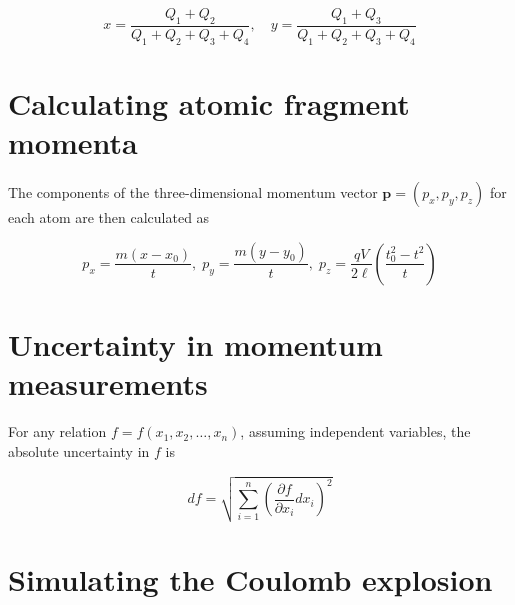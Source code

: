 \begin{equation}
x = \frac{Q_1 + Q_2}{Q_1 + Q_2 + Q_3 + Q_4} ,\quad
y = \frac{Q_1 + Q_3}{Q_1 + Q_2 + Q_3 + Q_4}
\end{equation}


\section{Calculating atomic fragment momenta}
The components of the three-dimensional momentum vector $\mathbf{p} = (p_x,p_y,p_z)$ for each atom are then calculated as

\begin{equation}
p_x = \frac{m(x-x_0)}{t} ,\;
p_y = \frac{m(y-y_0)}{t} ,\;
p_z = \frac{qV}{2\ell} \left( \frac{t_0^2 - t^2}{t} \right)
\end{equation}

\section{Uncertainty in momentum measurements}
For any relation $f = f(x_1, x_2, \dots, x_n)$, assuming independent variables, the absolute uncertainty in $f$ is

\begin{equation}
df = \sqrt{\sum_{i=1}^{n} \left( \frac{\partial f}{\partial x_i} dx_i \right)^2}
\end{equation}

\section{Simulating the Coulomb explosion}
